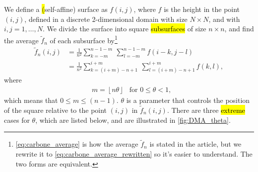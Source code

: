 We define a \hl(self-affine) surface as $f(i,j)$, where $f$ is the height in the point $(i,j)$, defined in a discrete 2-dimensional domain with size $N\times N$, and with $i,j = 1,\dots,N$. We divide the surface into square \hl{subsurfaces} of size $n \times n$, and find the average $\tilde f_n$ of each subsurface by\footnote{\cref{eq:carbone_average} is how the average $\tilde f_n$ is stated in the article\cite{carbone2007algorithm}, but we rewrite it to \cref{eq:carbone_average_rewritten} so it's easier to understand. The two forms are equivalent.}
\begin{align}
    \tilde f_n(i,j) 
    &= \frac{1}{n^2}\sum_{k=-m}^{n-1-m} ~ \sum_{l=-m}^{n-1-m} f(i-k, j-l) \label{eq:carbone_average}\\
    &= \frac{1}{n^2} \sum_{k=(i+m)-n+1}^{i+m} ~ \sum_{l=(i+m)-n+1}^{i+m} f(k, l), \label{eq:carbone_average_rewritten}
\end{align}
where
\begin{align*}
    &m = \left \lfloor n\theta \right \rfloor &\text{for }0 \leq \theta < 1,
\end{align*}
which means that $0 \leq m \leq (n-1)$. $\theta$ is a parameter that controls the position of the square relative to the point $(i,j)$ in $\tilde f_n(i,j)$. There are three \hl{extreme} cases for $\theta$, which are listed below, and are illustrated in \cref{fig:DMA_theta}.
